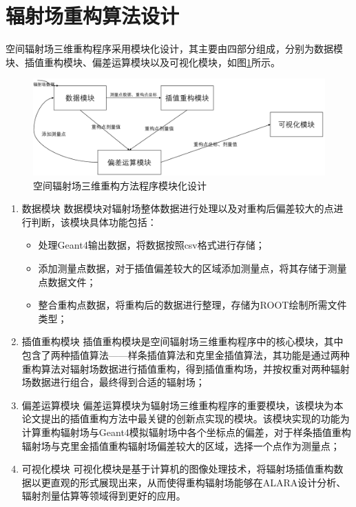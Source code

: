 \section{辐射场重构算法设计}
空间辐射场三维重构程序采用模块化设计，其主要由四部分组成，分别为数据模块、插值重构模块、偏差运算模块以及可视化模块，如图\ref{空间辐射场三维重构方法程序模块化设计}所示。
\begin{figure}
      \centering
      \includegraphics[width=1.0\textwidth]{figure/辐射场重构程序模块.pdf}
      \caption{空间辐射场三维重构方法程序模块化设计}
      \label{空间辐射场三维重构方法程序模块化设计}
\end{figure}
\begin{enumerate}
      \item 数据模块
            \newline 数据模块对辐射场整体数据进行处理以及对重构后偏差较大的点进行判断，该模块具体功能包括：
            \begin{itemize}
                  \item 处理Geant4输出数据，将数据按照csv格式进行存储；
                  \item 添加测量点数据，对于插值偏差较大的区域添加测量点，将其存储于测量点数据文件；
                  \item 整合重构点数据，将重构后的数据进行整理，存储为ROOT绘制所需文件类型；
            \end{itemize}
      \item 插值重构模块
            \newline 插值重构模块是空间辐射场三维重构程序中的核心模块，其中包含了两种插值算法——样条插值算法和克里金插值算法，其功能是通过两种重构算法对辐射场数据进行插值重构，得到插值重构场，并按权重对两种辐射场数据进行组合，最终得到合适的辐射场；
      \item 偏差运算模块
            \newline 偏差运算模块为辐射场三维重构程序的重要模块，该模块为本论文提出的插值重构方法中最关键的创新点实现的模块。该模块实现的功能为计算重构辐射场与Geant4模拟辐射场中各个坐标点的偏差，对于样条插值重构辐射场与克里金插值重构辐射场偏差较大的区域，选择一个点作为测量点；
      \item 可视化模块
            \newline 可视化模块是基于计算机的图像处理技术，将辐射场插值重构数据以更直观的形式展现出来，从而使得重构辐射场能够在ALARA设计分析、辐射剂量估算等领域得到更好的应用。
\end{enumerate}

